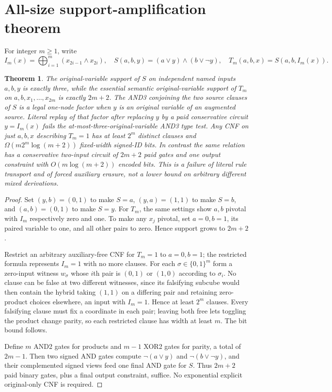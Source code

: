 \documentclass[11pt]{article}
\newtheorem{theorem}{Theorem}
\begin{document}
\section*{All-size support-amplification theorem}
For integer $m\ge1$, write
\[
 I_m(x)=\bigoplus_{i=1}^{m}(x_{2i-1}\wedge x_{2i}),\quad
 S(a,b,y)=(a\vee y)\wedge(b\vee\neg y),\quad
 T_m(a,b,x)=S(a,b,I_m(x)).
\]
\begin{theorem}
The original-variable support of $S$ on independent named inputs $a,b,y$ is exactly three, while the essential semantic original-variable support of $T_m$ on $a,b,x_1,\dots,x_{2m}$ is exactly $2m+2$. The AND3 conjoining the two source clauses of $S$ is a legal one-node factor when $y$ is an original variable of an augmented source. Literal replay of that factor after replacing $y$ by a paid conservative circuit $y=I_m(x)$ fails the at-most-three-original-variable AND3 type test. Any CNF on just $a,b,x$ describing $T_m=1$ has at least $2^m$ distinct clauses and $\Omega(m2^m\log(m+2))$ fixed-width signed-ID bits. In contrast the same relation has a conservative two-input circuit of $2m+2$ paid gates and one output constraint with $O(m\log(m+2))$ encoded bits. This is a failure of \emph{literal rule transport} and of \emph{forced auxiliary erasure}, not a lower bound on arbitrary different mixed derivations.
\end{theorem}
\begin{proof}
Set $(y,b)=(0,1)$ to make $S=a$, $(y,a)=(1,1)$ to make $S=b$, and $(a,b)=(0,1)$ to make $S=y$. For $T_m$, the same settings show $a,b$ pivotal with $I_m$ respectively zero and one. To make any $x_j$ pivotal, set $a=0,b=1$, its paired variable to one, and all other pairs to zero. Hence support grows to $2m+2$.
\par Restrict an arbitrary auxiliary-free CNF for $T_m=1$ to $a=0,b=1$; the restricted formula represents $I_m=1$ with no more clauses. For each $\sigma\in\{0,1\}^m$ form a zero-input witness $w_\sigma$ whose $i$th pair is $(0,1)$ or $(1,0)$ according to $\sigma_i$. No clause can be false at two different witnesses, since its falsifying subcube would then contain the hybrid taking $(1,1)$ on a differing pair and retaining zero-product choices elsewhere, an input with $I_m=1$. Hence at least $2^m$ clauses. Every falsifying clause must fix a coordinate in each pair; leaving both free lets toggling the product change parity, so each restricted clause has width at least $m$. The bit bound follows.
\par Define $m$ AND2 gates for products and $m-1$ XOR2 gates for parity, a total of $2m-1$. Then two signed AND gates compute $\neg(a\vee y)$ and $\neg(b\vee\neg y)$, and their complemented signed views feed one final AND gate for $S$. Thus $2m+2$ paid binary gates, plus a final output constraint, suffice. No exponential explicit original-only CNF is required.
\end{proof}
\end{document}
